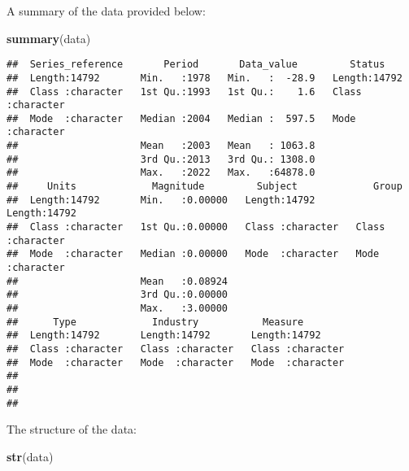 \documentclass[
]{article}
\newenvironment{Shaded}{\begin{snugshade}}{\end{snugshade}}
\newcommand{\FunctionTok}[1]{\textcolor[rgb]{0.13,0.29,0.53}{\textbf{#1}}}
\newcommand{\NormalTok}[1]{#1}
\begin{document}
A summary of the data provided below:

\begin{Shaded}
\begin{Highlighting}[]
\FunctionTok{summary}\NormalTok{(data)}
\end{Highlighting}
\end{Shaded}

\begin{verbatim}
##  Series_reference       Period       Data_value         Status         
##  Length:14792       Min.   :1978   Min.   :  -28.9   Length:14792      
##  Class :character   1st Qu.:1993   1st Qu.:    1.6   Class :character  
##  Mode  :character   Median :2004   Median :  597.5   Mode  :character  
##                     Mean   :2003   Mean   : 1063.8                     
##                     3rd Qu.:2013   3rd Qu.: 1308.0                     
##                     Max.   :2022   Max.   :64878.0                     
##     Units             Magnitude         Subject             Group          
##  Length:14792       Min.   :0.00000   Length:14792       Length:14792      
##  Class :character   1st Qu.:0.00000   Class :character   Class :character  
##  Mode  :character   Median :0.00000   Mode  :character   Mode  :character  
##                     Mean   :0.08924                                        
##                     3rd Qu.:0.00000                                        
##                     Max.   :3.00000                                        
##      Type             Industry           Measure         
##  Length:14792       Length:14792       Length:14792      
##  Class :character   Class :character   Class :character  
##  Mode  :character   Mode  :character   Mode  :character  
##                                                          
##                                                          
## 
\end{verbatim}

The structure of the data:

\begin{Shaded}
\begin{Highlighting}[]
\FunctionTok{str}\NormalTok{(data)}
\end{Highlighting}
\end{Shaded}
\end{document}
